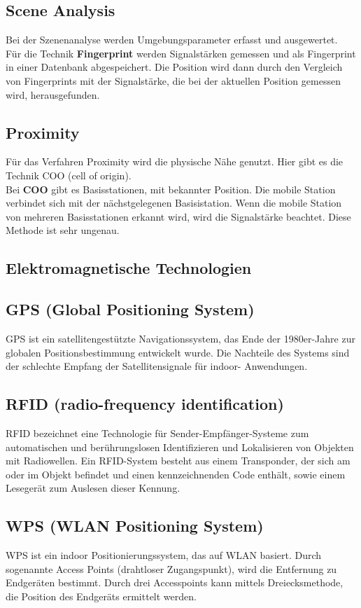     \subsection*{Scene Analysis}
    Bei der Szenenanalyse werden Umgebungsparameter erfasst und ausgewertet.\\
    Für die Technik \textbf{Fingerprint} werden Signalstärken gemessen und als Fingerprint in einer Datenbank abgespeichert. Die Position wird dann durch den Vergleich von Fingerprints mit der Signalstärke, die bei der aktuellen Position gemessen wird, herausgefunden.
    \subsection*{Proximity}
    Für das Verfahren Proximity wird die physische Nähe genutzt.
    Hier gibt es die Technik COO (cell of origin). \\
    Bei \textbf{COO} gibt es Basisstationen, mit bekannter Position. Die mobile Station verbindet sich mit der nächstgelegenen Basisistation. Wenn die mobile Station von mehreren Basisstationen erkannt wird, wird die Signalstärke beachtet. Diese Methode ist sehr ungenau.

    \subsection{Elektromagnetische Technologien}
    \subsection*{GPS (Global Positioning System)}
    GPS ist ein satellitengestützte Navigationssystem, das Ende der 1980er-Jahre zur globalen Positionsbestimmung entwickelt wurde. Die Nachteile des Systems sind der schlechte Empfang der Satellitensignale für indoor- Anwendungen.
    \subsection*{RFID (radio-frequency identification)}
    RFID bezeichnet eine Technologie für Sender-Empfänger-Systeme zum automatischen und berührungslosen Identifizieren und Lokalisieren von Objekten mit Radiowellen. Ein RFID-System besteht aus einem Transponder, der sich am oder im Objekt befindet und einen kennzeichnenden Code enthält, sowie einem Lesegerät zum Auslesen dieser Kennung.
    \subsection*{WPS (WLAN Positioning System)}
    WPS ist ein indoor Positionierungssystem, das auf WLAN basiert. Durch sogenannte  Access Points (drahtloser Zugangspunkt), wird die Entfernung zu Endgeräten bestimmt. Durch drei Accesspoints kann mittels Dreiecksmethode, die Position des Endgeräts ermittelt werden.

